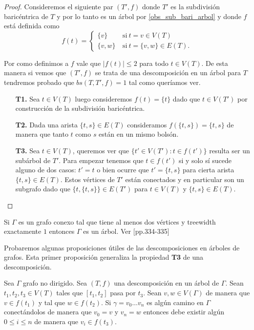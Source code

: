 \documentclass[tesis.tex]{subfiles}
\begin{document}
\begin{proof}
	Consideremos el siguiente par $(T',f)$ donde $T'$ es la subdivisión baricéntrica de $T$ y por lo tanto es un árbol por \ref{obs_sub_bari_arbol} y donde $f$ está definida como
	\[
	f(t) = 
	\begin{cases}
		\{ v \} \ & \text{si} \ t = v \in V(T) 				\\
		\{ v,w  \} \ &\text{si} \ t = \{ v,w\} \in E(T).
	\end{cases}
	\]
	
	
	Por como definimos a $f$ vale que $|f(t)| \le 2$ para todo $t \in V(T)$.
	De esta manera si vemos que $(T',f)$ se trata de una descomposición en un árbol para $T$ tendremos probado que $bs(T,T',f) = 1$ tal como queríamos ver.
	
	\begin{enumerate}
		\item[\textbf{T1.}] 
		Sea $t \in V(T)$ luego consideremos $f(t) = \{ t \}$ dado que $t \in V(T')$ por construcción de la subdivisión baricéntrica.
		
		\item[\textbf{T2.}] 
		Dada una arista $\{t,s\} \in E(T)$ consideramos $f(\{ t,s \}) = \{ t,s \} $ de manera que tanto $t$ como $s$ están en un mismo bolsón.
		
		\item[\textbf{T3.}] 
		Sea $t \in V(T)$, queremos ver que $\{ t' \in V(T') :  t \in f(t') \}$ resulta ser un subárbol de $T'$.		
		Para empezar tenemos que $t \in f(t')$ si y solo sí sucede alguno de dos casos:
		$t' = t$ o bien ocurre que $t' = \{ t,s \}$ para cierta arista $\{t,s\} \in E(T)$.
		Estos vértices de $T'$ están conectados y en particular son un subgrafo dado que $ \{t, \{t,s\}\} \in E(T')$ para $t \in V(T)$ y $\{t,s\} \in E(T)$. 
	\end{enumerate}
	
\end{proof}


\begin{obs}
	Si $\Gamma$ es un grafo conexo tal que tiene al menos dos vértices y treewidth exactamente $1$ entonces $\Gamma$ es un árbol.
	Ver \cite{diestel2005graph}[pp.334-335]
\end{obs}

Probaremos algunas proposiciones útiles de las descomposiciones en árboles de grafos.
Esta primer proposición generaliza la propiedad \textbf{T3} de una descomposición.
\begin{prop}\label{prop-camino-desc}
	Sea $\Gamma$ grafo no dirigido.
	Sea $(T,f)$ una descomposición en un árbol de $\Gamma$.
	Sean $t_{1},t_{2},t_{3} \in V(T)$ tales que $[t_1,t_2]$ pasa por $t_{3}$.
	Sean $v,w \in V(\Gamma)$ de manera que $v \in f(t_{1})$ y tal que $w \in f(t_{2})$.
	Si $\gamma = v_0 \dots v_n$ es algún camino en $\Gamma$ conectándolos de manera que $v_{0}=v$ y $v_{n} = w$	
	entonces debe existir algún $ 0 \le i \le n$ de manera que $v_i \in f(t_{3})$. 
\end{prop}
\end{document}
